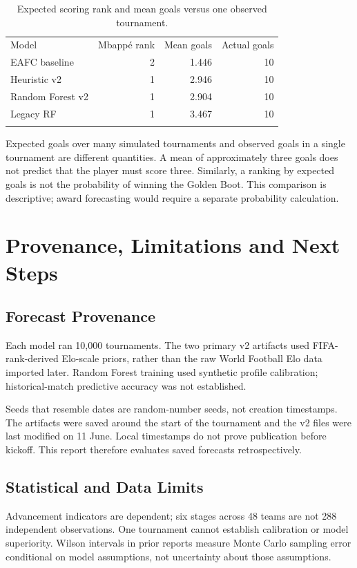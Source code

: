 \documentclass[11pt,a4paper]{article}
\newcommand{\toprule}{\noalign{\hrule height 0.8pt}\noalign{\vskip 3pt}}
\newcommand{\midrule}{\noalign{\vskip 2pt}\noalign{\hrule height 0.4pt}\noalign{\vskip 3pt}}
\newcommand{\bottomrule}{\noalign{\vskip 3pt}\noalign{\hrule height 0.8pt}}
\begin{document}
\begin{table}[ht]
\centering\small
\caption{Expected scoring rank and mean goals versus one observed tournament.}
\begin{tabular}{lrrr}
\toprule
Model & Mbapp\'{e} rank & Mean goals & Actual goals \\
\midrule
EAFC baseline & 2 & 1.446 & 10 \\
Heuristic v2 & 1 & 2.946 & 10 \\
Random Forest v2 & 1 & 2.904 & 10 \\
Legacy RF & 1 & 3.467 & 10 \\
\bottomrule
\end{tabular}
\end{table}

Expected goals over many simulated tournaments and observed goals in a single
tournament are different quantities. A mean of approximately three goals does
not predict that the player must score three. Similarly, a ranking by expected
goals is not the probability of winning the Golden Boot. This comparison is
descriptive; award forecasting would require a separate probability calculation.
\section{Provenance, Limitations and Next Steps}
\subsection{Forecast Provenance}
Each model ran 10,000 tournaments. The two primary v2 artifacts used
FIFA-rank-derived Elo-scale priors, rather than the raw World Football Elo data
imported later. Random Forest training used synthetic profile calibration;
historical-match predictive accuracy was not established.

Seeds that resemble dates are random-number seeds, not creation timestamps.
The artifacts were saved around the start of the tournament and the v2 files
were last modified on 11 June. Local timestamps do not prove publication before
kickoff. This report therefore evaluates saved forecasts retrospectively.
\subsection{Statistical and Data Limits}
Advancement indicators are dependent; six stages across 48 teams are not 288
independent observations. One tournament cannot establish calibration or model
superiority. Wilson intervals in prior reports measure Monte Carlo sampling
error conditional on model assumptions, not uncertainty about those assumptions.
\end{document}
